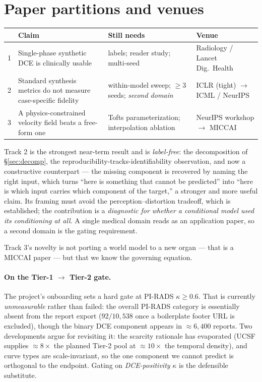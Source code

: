 \documentclass[11pt]{article}
\newcommand{\1}{\mathbb{1}}
\begin{document}
\section{Paper partitions and venues}

\begin{center}
\renewcommand{\arraystretch}{1.2}
\small
\begin{tabular}{p{0.5cm}p{4.2cm}p{4.6cm}p{3.6cm}}
\toprule
& Claim & Still needs & Venue \\
\midrule
1 & Single-phase synthetic DCE is clinically usable & labels; reader study; multi-seed & Radiology / Lancet Dig.\ Health \\
2 & Standard synthesis metrics do not measure case-specific fidelity & within-model sweep; $\ge3$ seeds; \emph{second domain} & ICLR (tight) $\to$ ICML / NeurIPS \\
3 & A physics-constrained velocity field beats a free-form one & Tofts parameterization; interpolation ablation & NeurIPS workshop $\to$ MICCAI \\
\bottomrule
\end{tabular}
\end{center}

Track 2 is the strongest near-term result and is \emph{label-free}: the decomposition of
\S\ref{sec:decomp}, the reproducibility-tracks-identifiability observation, and now a
constructive counterpart --- the missing component is recovered by naming the right input,
which turns ``here is something that cannot be predicted'' into ``here is which input carries
which component of the target,'' a stronger and more useful claim. Its framing
must avoid the perception--distortion tradeoff, which is established; the contribution is a
\emph{diagnostic for whether a conditional model used its conditioning at all}. A single
medical domain reads as an application paper, so a second domain is the gating requirement.

Track 3's novelty is not porting a world model to a new organ --- that is a MICCAI paper ---
but that we know the governing equation.

\paragraph{On the Tier-1 $\to$ Tier-2 gate.} The project's onboarding sets a hard gate at
PI-RADS $\kappa\ge0.6$. That is currently \emph{unmeasurable} rather than failed: the overall
PI-RADS category is essentially absent from the report export ($92/10{,}538$ once a
boilerplate footer URL is excluded), though the binary DCE component appears in
$\approx6{,}400$ reports. Two developments argue for revisiting it: the scarcity rationale
has evaporated (UCSF supplies $\approx8\times$ the planned Tier-2 pool at $\approx10\times$
the temporal density), and curve types are scale-invariant, so the one component we cannot
predict is orthogonal to the endpoint. Gating on \emph{DCE-positivity} $\kappa$ is the
defensible substitute.
\end{document}
